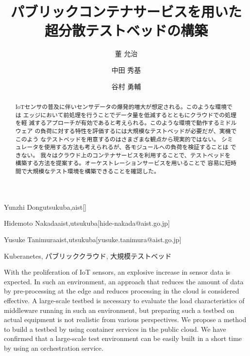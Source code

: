 \documentclass[submit,techrep]{ipsj}
\begin{document}
\title{パブリックコンテナサービスを用いた\\超分散テストベッドの構築}




\author{董 允治}{Yunzhi Dong}{utsukuba,aist}[]
\author{中田 秀基}{Hidemoto Nakada}{aist,utsukuba}[hide-nakada@aist.go.jp]
\author{谷村 勇輔}{Yusuke Tanimura}{aist,utsukuba}[yusuke.tanimura@aist.go.jp]


\begin{abstract}
  IoTセンサの普及に伴いセンサデータの爆発的増大が想定される。このような環境では
  エッジにおいて前処理を行うことでデータ量を低減するとともにクラウドでの処理を軽
  減するアプローチが有効であると考えられる。このような環境で動作するミドルウェア
  の負荷に対する特性を評価するには大規模なテストベッドが必要だが、実機でこのよう
  なテストベッドを用意するのはさまざまな観点から現実的ではない。
  シミュレータを使用する方法も考えられるが、各モジュールへの負荷を検証することは
  できない。
  我々はクラウド上のコンテナサービスを利用することで、テストベッドを
  構築する方法を提案する。オーケストレーションサービスを用いることで
  容易に短時間で大規模なテスト環境を構築できることを確認した。
\end{abstract}

\begin{jkeyword}
  Kuberanetes, パブリッククラウド, 大規模テストベッド
\end{jkeyword}

\begin{eabstract}
  With the proliferation of IoT sensors,
  an explosive increase in sensor data is expected. 
  In such an environment, an approach that reduces the amount of 
  data by pre-processing at the edge and reduces processing 
  in the cloud is considered effective.
  A large-scale testbed is necessary to evaluate the load characteristics 
  of middleware running in such an environment, 
  but preparing such a testbed on actual equipment is not 
  realistic from various perspectives.
  We propose a method to build a testbed by using container services in the public cloud.
  We have confirmed that a large-scale test environment 
  can be easily built in a short time by using an orchestration service.
\end{eabstract}
\end{document}
